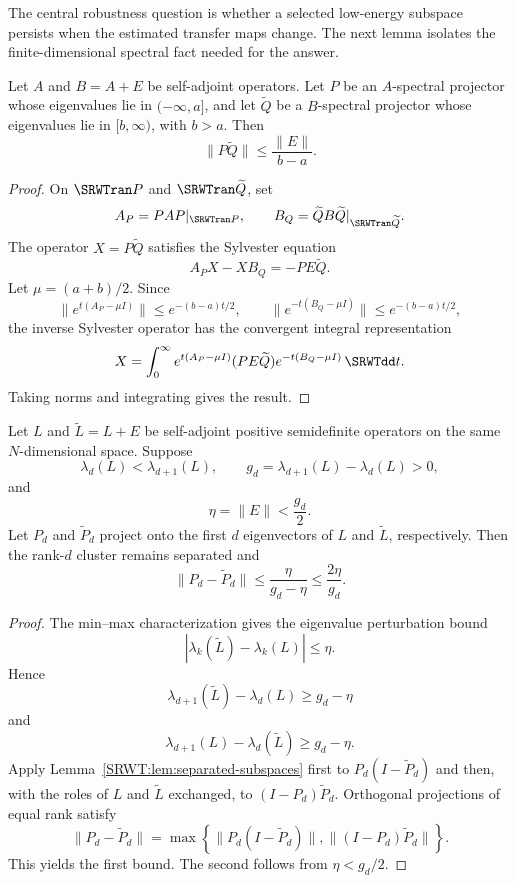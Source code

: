 The central robustness question is whether a selected low-energy subspace
persists when the estimated transfer maps change. The next lemma isolates the
finite-dimensional spectral fact needed for the answer.

\begin{SRWTlemma}\label{SRWT:lem:separated-subspaces}
Let \(A\) and \(B=A+E\) be self-adjoint operators. Let \(P\) be an
\(A\)-spectral projector whose eigenvalues lie in \(( -\infty,a]\), and let
\(\widetilde Q\) be a \(B\)-spectral projector whose eigenvalues lie in
\([b,\infty)\), with \(b>a\). Then
\[
\|P\widetilde Q\|
\leq
\frac{\|E\|}{b-a}.
\]
\end{SRWTlemma}

\begin{proof}
On \(\SRWTran P\) and \(\SRWTran\widetilde Q\), set
\[
A_P=PAP|_{\SRWTran P},
\qquad
B_Q=\widetilde QB\widetilde Q|_{\SRWTran\widetilde Q}.
\]
The operator \(X=P\widetilde Q\) satisfies the Sylvester equation
\[
A_PX-XB_Q=-PE\widetilde Q.
\]
Let \(\mu=(a+b)/2\). Since
\[
\|e^{t(A_P-\mu I)}\|\leq e^{-(b-a)t/2},
\qquad
\|e^{-t(B_Q-\mu I)}\|\leq e^{-(b-a)t/2},
\]
the inverse Sylvester operator has the convergent integral representation
\[
X
=
\int_0^\infty
 e^{t(A_P-\mu I)}
 (PE\widetilde Q)
 e^{-t(B_Q-\mu I)}\,\SRWTdd t.
\]
Taking norms and integrating gives the result.
\end{proof}

\begin{SRWTtheorem}\label{SRWT:thm:spectral-stability}
Let \(L\) and \(\widetilde L=L+E\) be self-adjoint positive semidefinite
operators on the same \(N\)-dimensional space. Suppose
\[
\lambda_d(L)<\lambda_{d+1}(L),
\qquad
g_d=\lambda_{d+1}(L)-\lambda_d(L)>0,
\]
and
\[
\eta=\|E\|<\frac{g_d}{2}.
\]
Let \(P_d\) and \(\widetilde P_d\) project onto the first \(d\) eigenvectors
of \(L\) and \(\widetilde L\), respectively. Then the rank-\(d\) cluster
remains separated and
\[
\boxed{
\|P_d-\widetilde P_d\|
\leq
\frac{\eta}{g_d-\eta}
\leq
\frac{2\eta}{g_d}.
}
\]
\end{SRWTtheorem}

\begin{proof}
The min--max characterization gives the eigenvalue perturbation bound
\[
|\lambda_k(\widetilde L)-\lambda_k(L)|\leq\eta.
\]
Hence
\[
\lambda_{d+1}(\widetilde L)-\lambda_d(L)
\geq g_d-\eta
\]
and
\[
\lambda_{d+1}(L)-\lambda_d(\widetilde L)
\geq g_d-\eta.
\]
Apply Lemma~\ref{SRWT:lem:separated-subspaces} first to
\(P_d(I-\widetilde P_d)\) and then, with the roles of \(L\) and
\(\widetilde L\) exchanged, to \((I-P_d)\widetilde P_d\). Orthogonal
projections of equal rank satisfy
\[
\|P_d-\widetilde P_d\|
=
\max\left\{
\|P_d(I-\widetilde P_d)\|,
\|(I-P_d)\widetilde P_d\|
\right\}.
\]
This yields the first bound. The second follows from \(\eta<g_d/2\).
\end{proof}

